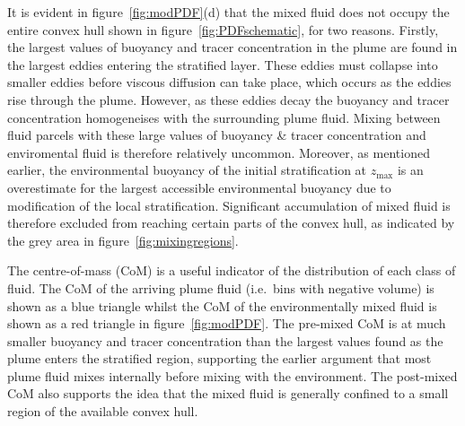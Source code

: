 \documentclass[a4paper]{article}
\begin{document}
It is evident in figure~\ref{fig:modPDF}(d) that the mixed fluid does not occupy the entire convex hull 
shown in figure~\ref{fig:PDFschematic}, for two reasons. Firstly, the largest values of buoyancy and
tracer concentration in the plume are found in the largest eddies entering the stratified layer. These eddies
must collapse into smaller eddies before viscous diffusion can take place, which occurs as the eddies rise
through the plume. However, as these eddies decay the buoyancy and tracer concentration homogeneises with the
surrounding plume fluid. Mixing between fluid parcels with these large values of buoyancy \& tracer
concentration and enviromental fluid is therefore relatively uncommon. Moreover, as mentioned earlier,
the environmental buoyancy of the initial stratification at $z_{\max}$ is an overestimate for the largest
accessible environmental buoyancy due to modification of the local stratification. Significant accumulation of
mixed fluid is therefore excluded from reaching certain parts of the convex hull, as indicated by the grey
area in figure~\ref{fig:mixingregions}. 

The centre-of-mass (CoM) is a useful indicator of the distribution of each class of fluid. The CoM of the
arriving plume fluid (i.e.\ bins with negative volume) is shown as a blue triangle whilst the CoM of the
environmentally mixed fluid is shown as a red triangle in figure~\ref{fig:modPDF}. The pre-mixed CoM is at
much smaller buoyancy and tracer concentration than the largest values found as the plume enters the
stratified region, supporting the earlier argument that most plume fluid mixes internally before mixing with
the environment. The post-mixed CoM also supports the idea that the mixed fluid is generally confined to a
small region of the available convex hull.
\end{document}
